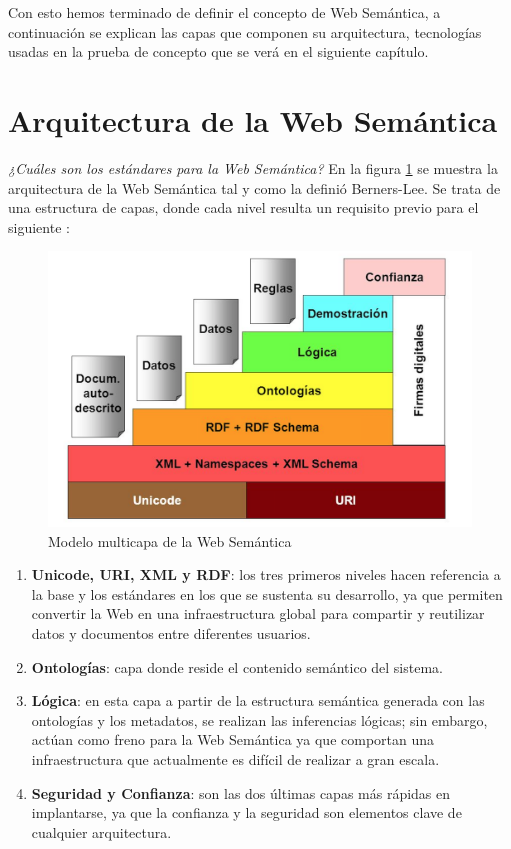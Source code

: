 Con esto hemos terminado de definir el concepto de Web Semántica, a continuación se explican las capas que componen su arquitectura, tecnologías usadas en la prueba de concepto que se verá en el siguiente capítulo.


\section{Arquitectura de la Web Semántica}


\textit{¿Cuáles son los estándares para la Web Semántica?} En la figura \ref{fig:arquitectura1} se muestra la arquitectura de la Web Semántica tal y como la definió Berners-Lee. Se trata de una estructura de capas, donde cada nivel resulta un requisito previo para el siguiente \cite{researchgate}:

\begin{figure}[H]
	\centering
	\includegraphics[width=0.6\linewidth]{imagenes/capitulo3/arquitectura1} 
	\caption{Modelo multicapa de la Web Semántica}
	\label{fig:arquitectura1}
\end{figure}

\begin{enumerate}
	\item \textbf{Unicode, URI, XML y RDF}: los tres primeros niveles hacen referencia a la base y los estándares en los que se sustenta su desarrollo, ya que permiten convertir la Web en una infraestructura global para compartir y reutilizar datos y documentos entre diferentes usuarios.
	
	\item \textbf{Ontologías}: capa donde reside el contenido semántico del sistema. 
	
	\item \textbf{Lógica}: en esta capa a partir de la estructura semántica generada con las ontologías y los metadatos, se realizan las inferencias lógicas; sin embargo, actúan como freno para la Web Semántica ya que comportan una infraestructura que actualmente es difícil de realizar a gran escala. 
	
	\item \textbf{Seguridad y Confianza}: son las dos últimas capas más rápidas en implantarse, ya que la confianza y la seguridad son elementos clave de cualquier arquitectura.
\end{enumerate}

